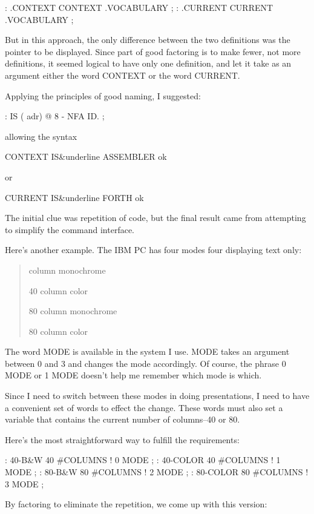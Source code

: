 \begin{Code}
: .CONTEXT   CONTEXT .VOCABULARY ;
: .CURRENT   CURRENT .VOCABULARY ;
\end{Code}
But in this approach, the only difference between the two definitions was the pointer to be displayed. Since part of good factoring is to make fewer, not more definitions, it seemed logical to have only one definition, and let it take as an argument either the word CONTEXT or the word CURRENT.

Applying the principles of good naming, I suggested:

\begin{Code}
: IS  ( adr)   @  8 -  NFA  ID. ;
\end{Code}
allowing the syntax

\begin{Code}[commandchars=\&\{\}]
CONTEXT IS&underline{ ASSEMBLER ok}
\end{Code}
or

\begin{Code}[commandchars=\&\{\}]
CURRENT IS&underline{ FORTH ok}
\end{Code}
The initial clue was repetition of code, but the final result came from attempting to simplify the command interface.

Here's another example. The IBM PC has four modes four displaying text only:

\begin{quote} column monochrome

40 column color

80 column monochrome

80 column color
\end{quote}
The word MODE is available in the \Forth{} system I use. MODE takes an argument between 0 and 3 and changes the mode accordingly. Of course, the phrase 0 MODE or 1 MODE doesn't help me remember which mode is which.

Since I need to switch between these modes in doing presentations, I need to have a convenient set of words to effect the change. These words must also set a variable that contains the current number of columns--40 or 80.

Here's the most straightforward way to fulfill the requirements:

\begin{Code}
: 40-B&W       40 #COLUMNS !  0 MODE ;
: 40-COLOR     40 #COLUMNS !  1 MODE ;
: 80-B&W       80 #COLUMNS !  2 MODE ;
: 80-COLOR     80 #COLUMNS !  3 MODE ;
\end{Code}
By factoring to eliminate the repetition, we come up with this version:

